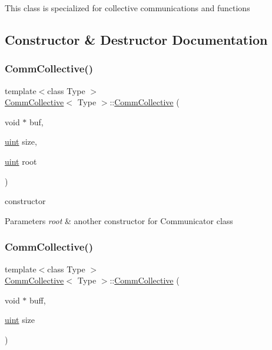 This class is specialized for collective communications and functions 

\subsection{Constructor \& Destructor Documentation}
\mbox{\label{classCommCollective_ad583efe49e3dd7883f76dcb82b34cebb}} 
\subsubsection{\texorpdfstring{Comm\+Collective()}{CommCollective()}\hspace{0.1cm}{\footnotesize\ttfamily [1/2]}}
{\footnotesize\ttfamily template$<$class Type $>$ \\
\mbox{\hyperlink{classCommCollective}{Comm\+Collective}}$<$ Type $>$\+::\mbox{\hyperlink{classCommCollective}{Comm\+Collective}} (\begin{DoxyParamCaption}\item[{void $\ast$}]{buf,  }\item[{\mbox{\hyperlink{definitions_8h_a69aa29b598b851b0640aa225a9e5d61d}{uint}}}]{size,  }\item[{\mbox{\hyperlink{definitions_8h_a69aa29b598b851b0640aa225a9e5d61d}{uint}}}]{root }\end{DoxyParamCaption})}

constructor 
\begin{DoxyParams}{Parameters}
{\em root} & another constructor for Communicator class \\
\hline
\end{DoxyParams}
\mbox{\label{classCommCollective_a9315504a2e5e83cb04f3b8e80b7ff3d5}} 
\subsubsection{\texorpdfstring{Comm\+Collective()}{CommCollective()}\hspace{0.1cm}{\footnotesize\ttfamily [2/2]}}
{\footnotesize\ttfamily template$<$class Type $>$ \\
\mbox{\hyperlink{classCommCollective}{Comm\+Collective}}$<$ Type $>$\+::\mbox{\hyperlink{classCommCollective}{Comm\+Collective}} (\begin{DoxyParamCaption}\item[{void $\ast$}]{buff,  }\item[{\mbox{\hyperlink{definitions_8h_a69aa29b598b851b0640aa225a9e5d61d}{uint}}}]{size }\end{DoxyParamCaption})}

